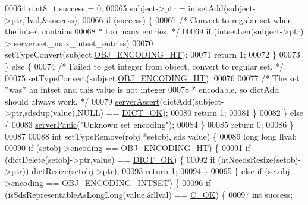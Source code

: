 \begin{DoxyCode}
00064             uint8\_t success = 0;
00065             subject->ptr = intsetAdd(subject->ptr,llval,&success);
00066             \textcolor{keywordflow}{if} (success) \{
00067                 \textcolor{comment}{/* Convert to regular set when the intset contains}
00068 \textcolor{comment}{                 * too many entries. */}
00069                 \textcolor{keywordflow}{if} (intsetLen(subject->ptr) > server.set\_max\_intset\_entries)
00070                     setTypeConvert(subject,\hyperlink{server_8h_a9c10219f68afc557d510d108257d238b}{OBJ\_ENCODING\_HT});
00071                 \textcolor{keywordflow}{return} 1;
00072             \}
00073         \} \textcolor{keywordflow}{else} \{
00074             \textcolor{comment}{/* Failed to get integer from object, convert to regular set. */}
00075             setTypeConvert(subject,\hyperlink{server_8h_a9c10219f68afc557d510d108257d238b}{OBJ\_ENCODING\_HT});
00076 
00077             \textcolor{comment}{/* The set *was* an intset and this value is not integer}
00078 \textcolor{comment}{             * encodable, so dictAdd should always work. */}
00079             \hyperlink{server_8h_a88114b5169b4c382df6b56506285e56a}{serverAssert}(dictAdd(subject->ptr,sdsdup(value),NULL) == 
      \hyperlink{dict_8h_a2afecbeab8f7efbc183048f52f6d17e5}{DICT\_OK});
00080             \textcolor{keywordflow}{return} 1;
00081         \}
00082     \} \textcolor{keywordflow}{else} \{
00083         \hyperlink{server_8h_a11cc378e7778a830b41240578de3b204}{serverPanic}(\textcolor{stringliteral}{"Unknown set encoding"});
00084     \}
00085     \textcolor{keywordflow}{return} 0;
00086 \}
00087 
00088 \textcolor{keywordtype}{int} setTypeRemove(robj *setobj, sds value) \{
00089     \textcolor{keywordtype}{long} \textcolor{keywordtype}{long} llval;
00090     \textcolor{keywordflow}{if} (setobj->encoding == \hyperlink{server_8h_a9c10219f68afc557d510d108257d238b}{OBJ\_ENCODING\_HT}) \{
00091         \textcolor{keywordflow}{if} (dictDelete(setobj->ptr,value) == \hyperlink{dict_8h_a2afecbeab8f7efbc183048f52f6d17e5}{DICT\_OK}) \{
00092             \textcolor{keywordflow}{if} (htNeedsResize(setobj->ptr)) dictResize(setobj->ptr);
00093             \textcolor{keywordflow}{return} 1;
00094         \}
00095     \} \textcolor{keywordflow}{else} \textcolor{keywordflow}{if} (setobj->encoding == \hyperlink{server_8h_a214173987de21c3b7661fddd42b05873}{OBJ\_ENCODING\_INTSET}) \{
00096         \textcolor{keywordflow}{if} (isSdsRepresentableAsLongLong(value,&llval) == \hyperlink{server_8h_a303769ef1065076e68731584e758d3e1}{C\_OK}) \{
00097             \textcolor{keywordtype}{int} success;

\end{DoxyCode}
